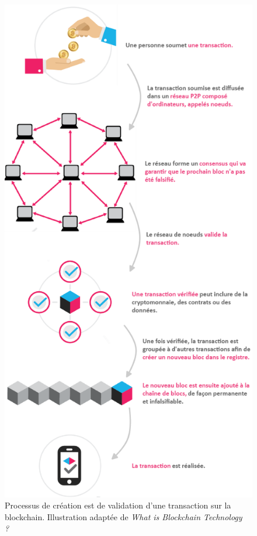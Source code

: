 \documentclass{tnreport}
\begin{document}
\begin{figure}[h]
	\centering
	\includegraphics[scale=0.45]{figures/blockchain-diagram}
	\caption{Processus de création est de validation d'une transaction sur la blockchain. Illustration adaptée de \textit{What is Blockchain Technology ?}~\cite{blockchain}}
	\label{fig:blockchain-diagram}
\end{figure}
\clearpage
\end{document}
